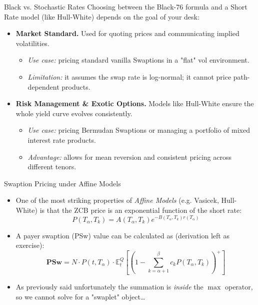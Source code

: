 \documentclass{beamer}
\begin{document}
	\begin{frame}{Black vs. Stochastic Rates}
		Choosing between the Black-76 formula and a Short Rate model (like Hull-White) depends on the goal of your desk:
		\vfill
		\begin{itemize}
			\item \textbf{Market Standard.} Used for quoting prices and communicating implied volatilities.
			\begin{itemize}
				\item \emph{Use case:} pricing standard vanilla Swaptions in a "flat" vol environment.
				\item \emph{Limitation:} it assumes the swap rate is log-normal; it cannot price path-dependent products.
			\end{itemize}
			\vfill
			\item \textbf{Risk Management \& Exotic Options.} Models like Hull-White ensure the whole yield curve evolves consistently.
			\begin{itemize}
				\item \emph{Use case:} pricing Bermudan Swaptions or managing a portfolio of mixed interest rate products.
				\item \emph{Advantage:} allows for mean reversion and consistent pricing across different tenors.
			\end{itemize}
		\end{itemize}
	\end{frame}

	\begin{frame}{Swaption Pricing under Affine Models}
		\begin{itemize}
			\item One of the most striking properties of \emph{Affine Models} (e.g. Vasicek, Hull-White) is that the ZCB price is an exponential function of the short rate:
			\begin{equation*}
				P(T_\alpha, T_k) = A(T_\alpha, T_k) e^{-B(T_\alpha, T_k) r(T_\alpha)}
			\end{equation*}
			\item A payer swaption (PSw) value can be calculated as (derivation left as exercise):
			\begin{equation}
				\textbf{PSw} = N\cdot P(t, T_\alpha)\cdot \mathbb{E}^{Q}_t \left[ \left( 1 - \sum_{k=\alpha+1}^\beta c_k P(T_\alpha, T_k) \right)^+ \right]
				\label{eq:swaption_payoff_std_v2}
			\end{equation}
			\item As previously said unfortunately the summation is \emph{inside} the $\max$ operator, so we cannot solve for a "swaplet" object\ldots
		\end{itemize}
	\end{frame}
\end{document}
